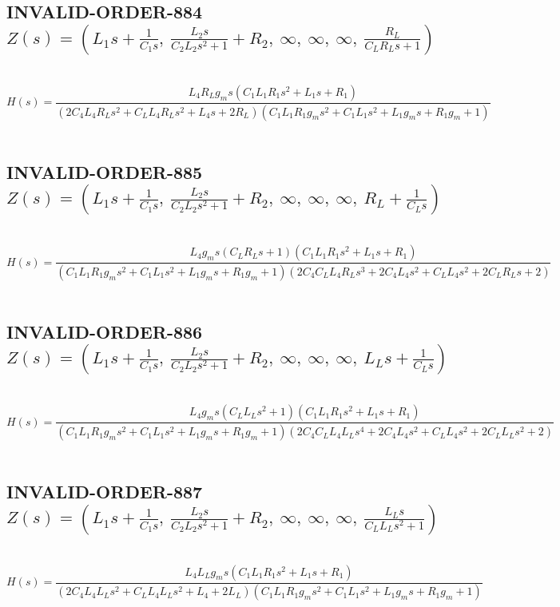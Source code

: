 \documentclass{article}
\begin{document}
\subsection{INVALID-ORDER-884 $Z(s) = \left( L_{1} s + \frac{1}{C_{1} s}, \  \frac{L_{2} s}{C_{2} L_{2} s^{2} + 1} + R_{2}, \  \infty, \  \infty, \  \infty, \  \frac{R_{L}}{C_{L} R_{L} s + 1}\right)$ } \ 
\textbf{\[H(s) = \frac{L_{4} R_{L} g_{m} s \left(C_{1} L_{1} R_{1} s^{2} + L_{1} s + R_{1}\right)}{\left(2 C_{4} L_{4} R_{L} s^{2} + C_{L} L_{4} R_{L} s^{2} + L_{4} s + 2 R_{L}\right) \left(C_{1} L_{1} R_{1} g_{m} s^{2} + C_{1} L_{1} s^{2} + L_{1} g_{m} s + R_{1} g_{m} + 1\right)}\] } \ 
\subsection{INVALID-ORDER-885 $Z(s) = \left( L_{1} s + \frac{1}{C_{1} s}, \  \frac{L_{2} s}{C_{2} L_{2} s^{2} + 1} + R_{2}, \  \infty, \  \infty, \  \infty, \  R_{L} + \frac{1}{C_{L} s}\right)$ } \ 
\textbf{\[H(s) = \frac{L_{4} g_{m} s \left(C_{L} R_{L} s + 1\right) \left(C_{1} L_{1} R_{1} s^{2} + L_{1} s + R_{1}\right)}{\left(C_{1} L_{1} R_{1} g_{m} s^{2} + C_{1} L_{1} s^{2} + L_{1} g_{m} s + R_{1} g_{m} + 1\right) \left(2 C_{4} C_{L} L_{4} R_{L} s^{3} + 2 C_{4} L_{4} s^{2} + C_{L} L_{4} s^{2} + 2 C_{L} R_{L} s + 2\right)}\] } \ 
\subsection{INVALID-ORDER-886 $Z(s) = \left( L_{1} s + \frac{1}{C_{1} s}, \  \frac{L_{2} s}{C_{2} L_{2} s^{2} + 1} + R_{2}, \  \infty, \  \infty, \  \infty, \  L_{L} s + \frac{1}{C_{L} s}\right)$ } \ 
\textbf{\[H(s) = \frac{L_{4} g_{m} s \left(C_{L} L_{L} s^{2} + 1\right) \left(C_{1} L_{1} R_{1} s^{2} + L_{1} s + R_{1}\right)}{\left(C_{1} L_{1} R_{1} g_{m} s^{2} + C_{1} L_{1} s^{2} + L_{1} g_{m} s + R_{1} g_{m} + 1\right) \left(2 C_{4} C_{L} L_{4} L_{L} s^{4} + 2 C_{4} L_{4} s^{2} + C_{L} L_{4} s^{2} + 2 C_{L} L_{L} s^{2} + 2\right)}\] } \ 
\subsection{INVALID-ORDER-887 $Z(s) = \left( L_{1} s + \frac{1}{C_{1} s}, \  \frac{L_{2} s}{C_{2} L_{2} s^{2} + 1} + R_{2}, \  \infty, \  \infty, \  \infty, \  \frac{L_{L} s}{C_{L} L_{L} s^{2} + 1}\right)$ } \ 
\textbf{\[H(s) = \frac{L_{4} L_{L} g_{m} s \left(C_{1} L_{1} R_{1} s^{2} + L_{1} s + R_{1}\right)}{\left(2 C_{4} L_{4} L_{L} s^{2} + C_{L} L_{4} L_{L} s^{2} + L_{4} + 2 L_{L}\right) \left(C_{1} L_{1} R_{1} g_{m} s^{2} + C_{1} L_{1} s^{2} + L_{1} g_{m} s + R_{1} g_{m} + 1\right)}\] } \ 
\end{document}

